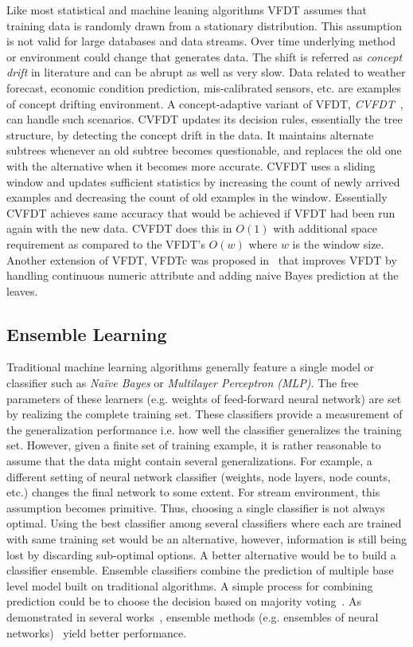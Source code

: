 Like most statistical and machine leaning algorithms VFDT assumes that training data is randomly drawn from a stationary distribution. This assumption is not valid for large databases and data streams. Over time underlying method or environment could change that generates data. The shift is  referred as {\it concept drift} in literature and can be abrupt as well as very slow. Data related to weather forecast, economic condition prediction, mis-calibrated sensors, etc. are examples of concept drifting environment. A concept-adaptive variant of VFDT, \textit{CVFDT}~\cite{hulten01:cvfdt}, can handle such scenarios. CVFDT updates its decision rules, essentially the tree structure, by detecting the concept drift in the data. It maintains alternate subtrees whenever an old subtree becomes questionable, and replaces the old one with the alternative when it becomes more accurate. CVFDT uses a sliding window and updates sufficient statistics by increasing the count of newly arrived examples and decreasing the count of old examples in the window. Essentially CVFDT achieves same accuracy that would be achieved if VFDT had been run again with the new data. CVFDT does this in $O(1)$ with additional space requirement as compared to the VFDT's $O(w)$ where $w$ is the window size. Another extension of VFDT, VFDTc was proposed in~\cite{gama05:vfdtc} that improves VFDT by handling continuous numeric attribute  and adding naive Bayes prediction at the leaves.



\subsection{Ensemble Learning}
Traditional machine learning algorithms generally feature a single model or classifier such as \textit{Na\"ive Bayes} or \textit{Multilayer Perceptron (MLP)}. The free parameters of these learners (e.g. weights of feed-forward neural network) are set by realizing the complete training set. These classifiers provide a measurement of the generalization performance i.e. how well the classifier generalizes the training set. However, given a finite set of training example, it is rather reasonable to assume that the data might contain several generalizations. For example, a different setting of neural network classifier (weights, node layers, node counts, etc.) changes the final network to some extent. For stream environment, this assumption becomes primitive. Thus, choosing a single classifier is not always optimal. Using the best classifier among several classifiers where each are trained with same training set would be an alternative, however, information is still being lost by discarding sub-optimal options. A better alternative would be to build a classifier ensemble. Ensemble classifiers combine the prediction of multiple base level model built on traditional algorithms. A simple process for combining prediction could be to choose the decision based on majority voting~\cite{parhami94:voting}. As demonstrated in several works~\cite{breiman93:regression, schapire90:whyens, wolpert92:whyens}, ensemble methods (e.g. ensembles of neural networks)~\cite{hansen90:ensNN, tumer99:whyens} yield better performance. 

